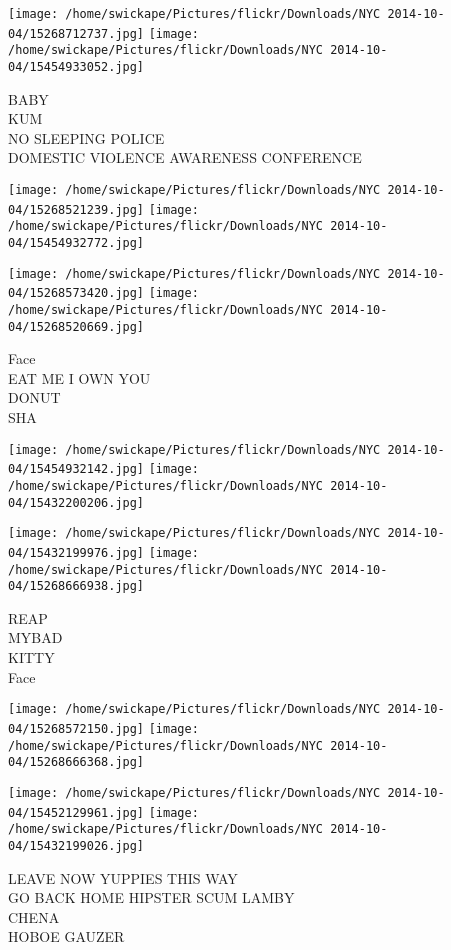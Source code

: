\documentclass[10pt,letterpaper]{article}
\begin{document}
\texttt{[image: /home/swickape/Pictures/flickr/Downloads/NYC 2014-10-04/15268712737.jpg]}
\texttt{[image: /home/swickape/Pictures/flickr/Downloads/NYC 2014-10-04/15454933052.jpg]}

BABY\\
KUM\\
NO SLEEPING POLICE\\
DOMESTIC VIOLENCE AWARENESS CONFERENCE\\
\pagebreak

\texttt{[image: /home/swickape/Pictures/flickr/Downloads/NYC 2014-10-04/15268521239.jpg]}
\texttt{[image: /home/swickape/Pictures/flickr/Downloads/NYC 2014-10-04/15454932772.jpg]}

\texttt{[image: /home/swickape/Pictures/flickr/Downloads/NYC 2014-10-04/15268573420.jpg]}
\texttt{[image: /home/swickape/Pictures/flickr/Downloads/NYC 2014-10-04/15268520669.jpg]}

Face\\
EAT ME I OWN YOU\\
DONUT\\
SHA\\
\pagebreak

\texttt{[image: /home/swickape/Pictures/flickr/Downloads/NYC 2014-10-04/15454932142.jpg]}
\texttt{[image: /home/swickape/Pictures/flickr/Downloads/NYC 2014-10-04/15432200206.jpg]}

\texttt{[image: /home/swickape/Pictures/flickr/Downloads/NYC 2014-10-04/15432199976.jpg]}
\texttt{[image: /home/swickape/Pictures/flickr/Downloads/NYC 2014-10-04/15268666938.jpg]}

REAP\\
MYBAD\\
KITTY\\
Face\\
\pagebreak

\texttt{[image: /home/swickape/Pictures/flickr/Downloads/NYC 2014-10-04/15268572150.jpg]}
\texttt{[image: /home/swickape/Pictures/flickr/Downloads/NYC 2014-10-04/15268666368.jpg]}

\texttt{[image: /home/swickape/Pictures/flickr/Downloads/NYC 2014-10-04/15452129961.jpg]}
\texttt{[image: /home/swickape/Pictures/flickr/Downloads/NYC 2014-10-04/15432199026.jpg]}

LEAVE NOW YUPPIES THIS WAY\\
GO BACK HOME HIPSTER SCUM LAMBY\\
CHENA\\
HOBOE GAUZER\\
\pagebreak
\end{document}
